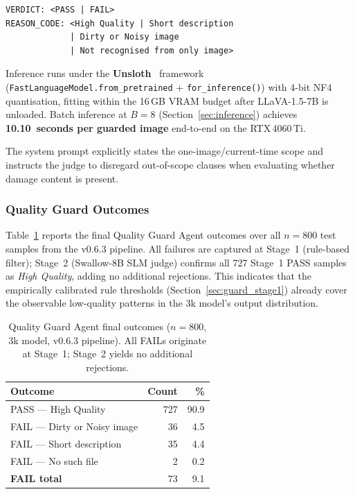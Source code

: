 \documentclass[twocolumn]{article}
\begin{document}
\begin{small}
\begin{verbatim}
VERDICT: <PASS | FAIL>
REASON_CODE: <High Quality | Short description
             | Dirty or Noisy image
             | Not recognised from only image>
\end{verbatim}
\end{small}

Inference runs under the \textbf{Unsloth}~\cite{han2023unsloth} framework
(\texttt{FastLanguageModel.from\_pretrained} + \texttt{for\_inference()})
with 4-bit NF4 quantisation, fitting within the 16\,GB VRAM budget after
LLaVA-1.5-7B is unloaded.
Batch inference at $B=8$ (Section~\ref{sec:inference}) achieves
\textbf{10.10~seconds per guarded image} end-to-end on the RTX\,4060\,Ti.

The system prompt explicitly states the one-image/current-time scope
and instructs the judge to disregard out-of-scope clauses when
evaluating whether damage content is present.

\subsubsection{Quality Guard Outcomes}

Table~\ref{tab:qg_outcomes} reports the final Quality Guard Agent
outcomes over all $n=800$ test samples from the v0.6.3 pipeline.
All failures are captured at Stage~1 (rule-based filter); Stage~2
(Swallow-8B SLM judge) confirms all 727 Stage~1 PASS samples as
\textit{High Quality}, adding no additional rejections.
This indicates that the empirically calibrated rule thresholds
(Section~\ref{sec:guard_stage1}) already cover the observable
low-quality patterns in the 3k model's output distribution.

\begin{table}[h]
\centering
\caption{Quality Guard Agent final outcomes ($n=800$, 3k model,
         v0.6.3 pipeline). All FAILs originate at Stage~1;
         Stage~2 yields no additional rejections.}
\label{tab:qg_outcomes}
\setlength{\tabcolsep}{3pt}
\begin{tabular}{lrr}
\toprule
\textbf{Outcome} & \textbf{Count} & \textbf{\%} \\
\midrule
PASS --- High Quality          & 727 & 90.9 \\
FAIL --- Dirty or Noisy image  &  36 &  4.5 \\
FAIL --- Short description     &  35 &  4.4 \\
FAIL --- No such file          &   2 &  0.2 \\
\midrule
\textbf{FAIL total}            &  73 &  9.1 \\
\bottomrule
\end{tabular}
\end{table}
\end{document}
